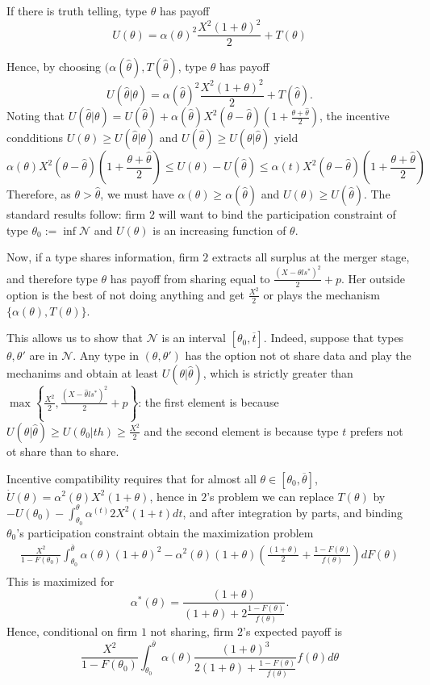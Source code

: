 \documentclass[a4paper]{article}
\newcommand{\N}{\mathcal N}
\renewcommand{\th}{\hat\theta}
\renewcommand{\t}{\theta}
\renewcommand{\a}{\alpha}
\begin{document}
If there is truth telling, type $\t$ has payoff
%
\[
U(\t)=\alpha(\t)^2 \frac{X^2(1+\t)^2}{2}+T(\t)
\]
%

Hence, by choosing $(\alpha(\th),T(\th)$, type $\t$ has payoff
%
\[
U(\th|\t)=\alpha(\th)^2 \frac{X^2(1+\t)^2}{2}+T(\th).
\]
%
Noting that $U(\th|\t)=U(\th)+\a(\th)X^2(\t-\th)\left(1+\frac{\t+\th}{2}\right)$, the incentive condditions $U(\t)\geq U(\th|\t)$ and $U(\th)\geq U(\t|\th)$ yield
%
\[
\a(\t) X^2(\t-\th)\left(1+\frac{\t+\th}{2}\right)   \leq U(\t)-U(\th) \leq \a(t)X^2(\t-\th)\left(1+\frac{\t+\th}{2}\right) 
\]
%
Therefore, as $\t>\th$, we must have $\a(\t)\geq \a(\th)$ and $U(\t)\geq U(\th)$.  The standard results follow: firm $2$ will want to bind the participation constraint of type $\t_0:=\inf \N$ and $U(\t)$ is an increasing function of $\t$.

Now, if a type shares information, firm $2$ extracts all surplus at the merger stage, and therefore type $\t$ has payoff from sharing equal to $\frac{(X-\t ls^*)^2}{2}+p$. Her outside option is the best of not doing anything and get $\frac{X^2}{2}$ or plays the mechanism $\{\a(\t),T(\t)\}$. 

This allows us to show that $\N$ is an interval $[\t_0,\overline t]$. Indeed, suppose that types $\t,\t'$ are in $\N$. Any type in $(\t,\t')$ has the option not ot share data and play the mechanims and obtain at least $U(\t|\th)$, which is strictly greater than $\max\left\{\frac{X^2}{2}, \frac{(X-\th ls^*)^2}{2}+p\right\}$: the first element is because $U(\t|\th)\geq U(\t_0|th)\geq \frac{X^2}{2}$ and the second element is because type $t$ prefers not ot share than to share. 

Incentive compatibility requires that for almost all $\t\in[\t_0,\overline \t]$, $\dot U(\t)=\a^2(\t) X^2(1+\t)$, hence in $2$'s problem we can replace $T(\t)$ by $-U(\t_0)-\int_{\t_0}^\t \a^(t)2 X^2(1+t)dt$, and after integration by parts, and binding $\t_0$'s participation constraint obtain the maximization problem
%
\begin{equation}
\begin{aligned}
    \frac{X^2}{1-F(\t_0)}\int_{\t_0}^{\overline \t}\a(\t) (1+\t)^2-\a^2(\t)(1+\t)\left(\frac{(1+\t)}{2}+\frac{1-F(\t)}{f(\t)}\right) dF(\t)\\
\end{aligned}
\end{equation}
This is maximized for 
%
\begin{equation}
    \a^*(\t)=\frac{(1+\t)}{(1+\t)+2 \frac{1-F(\t)}{f(\t)}}.
\end{equation}
%
Hence, conditional on firm $1$ not sharing, firm $2$'s expected payoff is 
%
\[
   \frac{X^2}{1-F(\t_0)}\int_{\t_0}^{\overline \t}\a(\t) \frac{(1+\t)^3}{2(1+\t)+\frac{1-F(\t)}{f(\t)}}f(\t)d\t
\]
%
\end{document}
